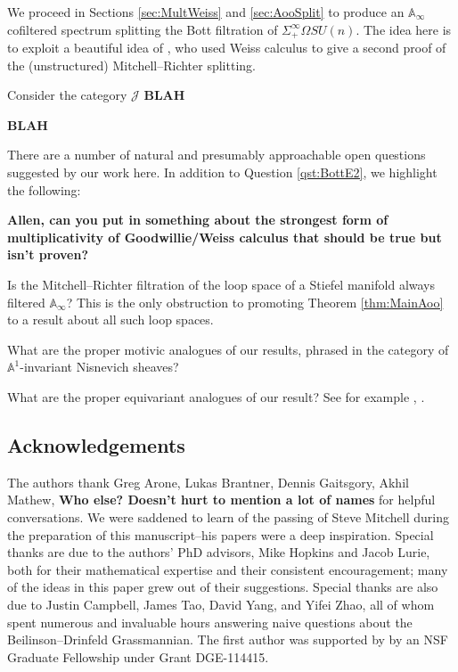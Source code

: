 We proceed in Sections \ref{sec:MultWeiss} and \ref{sec:AooSplit} to produce an $\mathbb{A}_\infty$ cofiltered spectrum splitting the Bott filtration of $\Sigma^{\infty}_+ \Omega SU(n)$.  The idea here is to exploit a beautiful idea of \cite{Arone}, who used Weiss calculus to give a second proof of the (unstructured) Mitchell--Richter splitting.

\begin{dfn}
Consider the category $\mathcal{J}$ \textbf{BLAH}
\end{dfn}

\textbf{BLAH}

There are a number of natural and presumably approachable open questions suggested by our work here.  In addition to Question \ref{qst:BottE2}, we highlight the following:

\begin{qst}
\textbf{
Allen, can you put in something about the strongest form of multiplicativity of Goodwillie/Weiss calculus that should be true but isn't proven?
}
\end{qst}

\begin{qst}
Is the Mitchell--Richter filtration of the loop space of a Stiefel manifold always filtered $\mathbb{A}_\infty$?  This is the only obstruction to promoting Theorem \ref{thm:MainAoo} to a result about all such loop spaces.
\end{qst}

\begin{qst}
What are the proper motivic analogues of our results, phrased in the category of $\mathbb{A}^1$-invariant Nisnevich sheaves?
\end{qst}

\begin{qst}
What are the proper equivariant analogues of our result?  See for example \cite{Ullman}, \cite{Tynan}.
\end{qst}

\subsection*{Acknowledgements}
The authors thank Greg Arone, Lukas Brantner, Dennis Gaitsgory, Akhil Mathew, \textbf{Who else?  Doesn't hurt to mention a lot of names} for helpful conversations.  We were saddened to learn of the passing of Steve Mitchell during the preparation of this manuscript--his papers were a deep inspiration.  Special thanks are due to the authors' PhD advisors, Mike Hopkins and Jacob Lurie, both for their mathematical expertise and their consistent encouragement; many of the ideas in this paper grew out of their suggestions.  Special thanks are also due to Justin Campbell, James Tao, David Yang, and Yifei Zhao, all of whom spent numerous and invaluable hours answering naive questions about the Beilinson--Drinfeld Grassmannian.  The first author was supported by by an NSF Graduate Fellowship under Grant DGE-114415.

